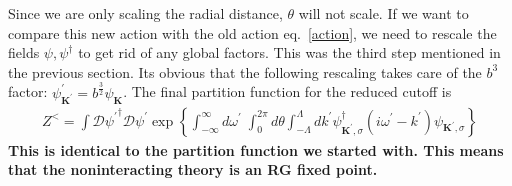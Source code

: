 \documentclass[14pt]{extarticle}
\begin{document}
Since we are only scaling the radial distance, \(\theta\) will not scale. If we want to compare this new action with the old action eq.~\ref{action}, we need to rescale the fields \(\psi,\psi^\dagger\) to get rid of any global factors. This was the third step mentioned in the previous section. Its obvious that the following rescaling takes care of the \(b^3\) factor: \(\psi^\prime_{\mathbf{K}^\prime} = b^{\frac{3}{2}}\psi_\mathbf{K}\). The final partition function for the reduced cutoff is
\begin{equation}\begin{aligned}
	Z^< = \int \mathcal{D}{\psi^\prime}^\dagger \mathcal{D}{\psi^\prime}\exp\left\{\int_{-\infty}^\infty d\omega^\prime\;\int_0^{2\pi} d\theta \int_{-\Lambda}^{\Lambda}dk^\prime\psi_{\mathbf K^\prime,\sigma}^\dagger \left(i\omega^\prime - k^\prime\right)\psi_{\mathbf K^\prime,\sigma}\right\}
\end{aligned}\end{equation}
\textbf{This is identical to the partition function we started with. This means that the noninteracting theory is an RG fixed point.}
\end{document}
